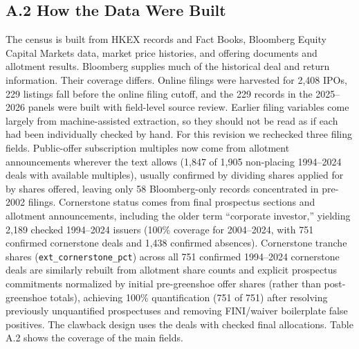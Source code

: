 \documentclass[11pt,letterpaper]{article}
\begin{document}
\subsection*{\texorpdfstring{A.2 How the Data Were Built}{A.2 How the Data Were Built}}
The census is built from HKEX records and Fact Books, Bloomberg Equity Capital Markets data, market price histories, and offering documents and allotment results. Bloomberg supplies much of the historical deal and return information. Their coverage differs. Online filings were harvested for 2,408 IPOs, 229 listings fall before the online filing cutoff, and the 229 records in the 2025–2026 panels were built with field-level source review. Earlier filing variables come largely from machine-assisted extraction, so they should not be read as if each had been individually checked by hand. For this revision we rechecked three filing fields. Public-offer subscription multiples now come from allotment announcements wherever the text allows (1,847 of 1,905 non-placing 1994–2024 deals with available multiples), usually confirmed by dividing shares applied for by shares offered, leaving only 58 Bloomberg-only records concentrated in pre-2002 filings. Cornerstone status comes from final prospectus sections and allotment announcements, including the older term ``corporate investor,'' yielding 2,189 checked 1994–2024 issuers (100\% coverage for 2004–2024, with 751 confirmed cornerstone deals and 1,438 confirmed absences). Cornerstone tranche shares (\texttt{\small ext\_\allowbreak{}cornerstone\_\allowbreak{}pct}) across all 751 confirmed 1994–2024 cornerstone deals are similarly rebuilt from allotment share counts and explicit prospectus commitments normalized by initial pre-greenshoe offer shares (rather than post-greenshoe totals), achieving 100\% quantification (751 of 751) after resolving previously unquantified prospectuses and removing FINI/waiver boilerplate false positives. The clawback design uses the deals with checked final allocations. Table A.2 shows the coverage of the main fields.
\end{document}
